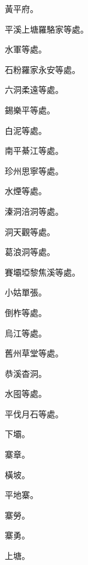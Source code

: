 \begin{pinyinscope}
 黃平府。



 平溪上塘羅駱家等處。



 水軍等處。



 石粉羅家永安等處。



 六洞柔遠等處。



 錫樂平等處。



 白泥等處。



 南平綦江等處。



 珍州思寧等處。



 水煙等處。



 溱洞涪洞等處。



 洞天觀等處。



 葛浪洞等處。



 賽壩埡黎焦溪等處。



 小姑單張。



 倒柞等處。



 烏江等處。



 舊州草堂等處。



 恭溪杳洞。



 水囤等處。



 平伐月石等處。



 下壩。



 寨章。



 橫坡。



 平地寨。



 寨勞。



 寨勇。



 上塘。




\end{pinyinscope}

